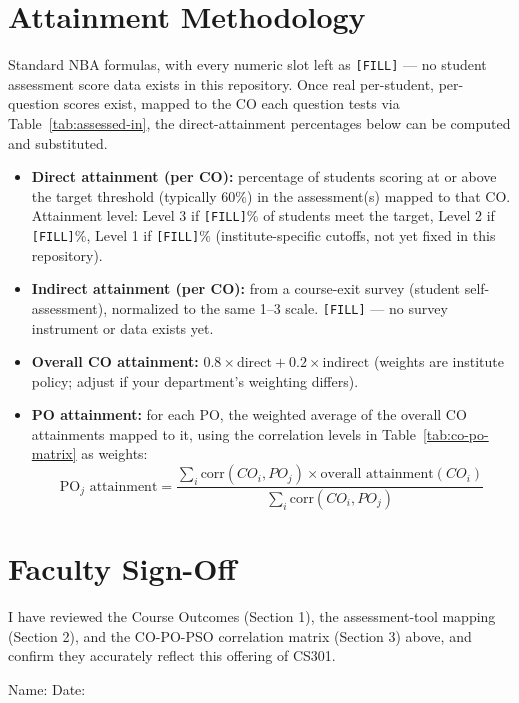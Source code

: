 \documentclass[11pt]{article}
\begin{document}
\section{Attainment Methodology}
\label{sec:attainment}

Standard NBA formulas, with every numeric slot left as \texttt{[FILL]} --- no student assessment score data exists in this repository. Once real per-student, per-question scores exist, mapped to the CO each question tests via Table~\ref{tab:assessed-in}, the direct-attainment percentages below can be computed and substituted.

\begin{itemize}
  \item \textbf{Direct attainment (per CO):} percentage of students scoring at or above the target threshold (typically 60\%) in the assessment(s) mapped to that CO. Attainment level: Level 3 if \texttt{[FILL]}\% of students meet the target, Level 2 if \texttt{[FILL]}\%, Level 1 if \texttt{[FILL]}\% (institute-specific cutoffs, not yet fixed in this repository).
  \item \textbf{Indirect attainment (per CO):} from a course-exit survey (student self-assessment), normalized to the same 1--3 scale. \texttt{[FILL]} --- no survey instrument or data exists yet.
  \item \textbf{Overall CO attainment:} $0.8 \times \text{direct} + 0.2 \times \text{indirect}$ (weights are institute policy; adjust if your department's weighting differs).
  \item \textbf{PO attainment:} for each PO, the weighted average of the overall CO attainments mapped to it, using the correlation levels in Table~\ref{tab:co-po-matrix} as weights:
  \[
    \text{PO}_j\text{ attainment} = \frac{\sum_{i} \text{corr}(CO_i, PO_j) \times \text{overall attainment}(CO_i)}{\sum_{i} \text{corr}(CO_i, PO_j)}
  \]
\end{itemize}

\section{Faculty Sign-Off}

I have reviewed the Course Outcomes (Section 1), the assessment-tool mapping (Section 2), and the CO-PO-PSO correlation matrix (Section 3) above, and confirm they accurately reflect this offering of CS301.

\bigskip
\noindent Name: \underline{\hspace{6cm}} \hfill Date: \underline{\hspace{3cm}}
\end{document}
